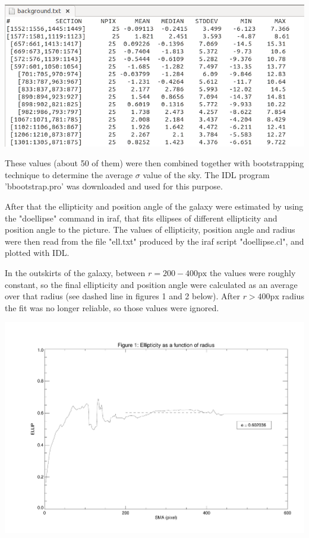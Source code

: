 \documentclass[a4paper,12pt]{article}
\begin{document}
\centerline{\includegraphics[scale=0.6]{background.png}}%

\vspace*{0.5cm}

These values (about 50 of them) were then combined together with bootstrapping technique to determine the average $\sigma$ value of the sky. The IDL program 'bbootstrap.pro' was downloaded and used for this purpose.

After that the ellipticity and position angle of the galaxy were estimated by using the "doellipse" command in iraf, that fits ellipses of different ellipticity and position angle to the picture. The values of ellipticity, position angle and radius were then read from the file "ell.txt" produced by the iraf script "doellipse.cl", and plotted with IDL. 

In the outskirts of the galaxy, between $r=200-400 \text{px}$ the values were roughly constant, so the final ellipticity and position angle were calculated as an average over that radius (see dashed line in figures 1 and 2 below). After $r>400\text{px}$ radius the fit was no longer reliable, so those values were ignored.

\centerline{\includegraphics[scale=0.6,page=1]{ellipticity.pdf}}%
\end{document}
